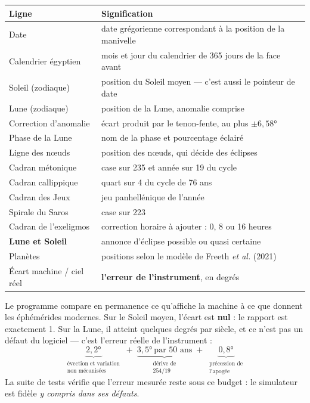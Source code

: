 \begin{center}
\small
\begin{tabularx}{\textwidth}{@{}lX@{}}
\toprule
\rowcolor{lightblue}\textbf{Ligne} & \textbf{Signification} \\
\midrule
Date & date grégorienne correspondant à la position de la manivelle \\
Calendrier égyptien & mois et jour du calendrier de 365 jours de la face avant \\
Soleil (zodiaque) & position du Soleil moyen — c'est aussi le pointeur de date \\
Lune (zodiaque) & position de la Lune, anomalie comprise \\
Correction d'anomalie & écart produit par le tenon-fente, au plus $\pm 6{,}58°$ \\
Phase de la Lune & nom de la phase et pourcentage éclairé \\
Ligne des n\oe uds & position des n\oe uds, qui décide des éclipses \\
Cadran métonique & case sur 235 et année sur 19 du cycle \\
Cadran callippique & quart sur 4 du cycle de 76 ans \\
Cadran des Jeux & jeu panhellénique de l'année \\
Spirale du Saros & case sur 223 \\
Cadran de l'exeligmos & correction horaire à ajouter : 0, 8 ou 16 heures \\
\textbf{Lune et Soleil} & annonce d'éclipse possible ou quasi certaine \\
Planètes & positions selon le modèle de Freeth \textit{et al.} (2021) \\
Écart machine / ciel réel & \textbf{l'erreur de l'instrument}, en degrés \\
\bottomrule
\end{tabularx}
\end{center}

\begin{info}
Le programme compare en permanence ce qu'affiche la machine à ce que donnent les éphémérides
modernes. Sur le Soleil moyen, l'écart est \textbf{nul} : le rapport est exactement 1. Sur la
Lune, il atteint quelques degrés par siècle, et ce n'est pas un défaut du logiciel — c'est
l'erreur réelle de l'instrument :
\[
\underbrace{2{,}2°}_{\substack{\text{évection et variation}\\ \text{non mécanisées}}}
\;+\;
\underbrace{3{,}5°\ \text{par 50 ans}}_{\substack{\text{dérive de}\\ 254/19}}
\;+\;
\underbrace{0{,}8°}_{\substack{\text{précession de}\\ \text{l'apogée}}}
\]
La suite de tests vérifie que l'erreur mesurée reste sous ce budget : le simulateur est
fidèle \emph{y compris dans ses défauts}.
\end{info}

